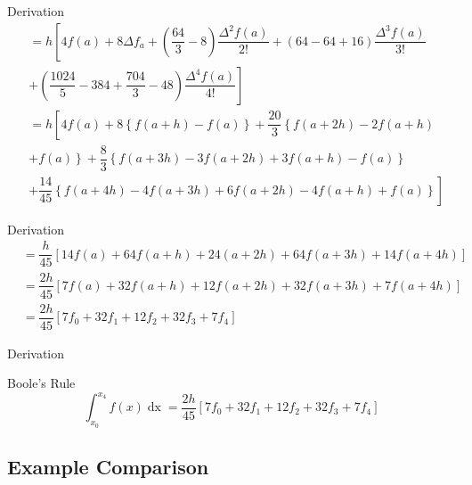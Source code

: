 \documentclass{beamer}
\begin{document}
\begin{frame}{Derivation}
  \begin{equation*}
    \begin{aligned}
      &= h\left[4f(a) + 8\Delta f_a + \left(\dfrac{64}{3} - 8\right)\dfrac{\Delta^2 f(a)}{2!} + \left(64 - 64 + 16\right)\dfrac{\Delta^3 f(a)}{3!} \right. \\ 
      &+ \left. \left(\dfrac{1024}{5} - 384 + \dfrac{704}{3} - 48\right)\dfrac{\Delta^4 f(a)}{4!}\right] \\
      &= h\left[4f(a) + 8\left\{f(a + h) - f(a)\right\} + \dfrac{20}{3}\left\{f(a + 2h) - 2f(a + h) \right. \right. \\ 
      &+ \left. f(a)\right\} + \dfrac{8}{3} \left\{f(a + 3h) - 3f(a + 2h) + 3f(a + h) - f(a)\right\} \\
      &+ \left. \dfrac{14}{45}\left\{f(a + 4h) - 4f(a + 3h) + 6f(a + 2h) - 4f(a + h) + f(a)\right\} \right] 
    \end{aligned}
  \end{equation*}
\end{frame}

\begin{frame}{Derivation}
  \begin{equation*}
    \begin{aligned}
      &= \dfrac{h}{45}\left[14f(a) + 64f(a + h) + 24(a + 2h) + 64f(a + 3h) + 14f(a + 4h)\right] \\
      &= \dfrac{2h}{45}\left[7f(a) + 32f(a + h) + 12f(a + 2h) + 32f(a + 3h) + 7f(a + 4h)\right] \\ 
      &= \dfrac{2h}{45}\left[7f_0 + 32f_1 + 12f_2 + 32f_3 + 7f_4\right]
    \end{aligned}
  \end{equation*}
\end{frame}

\begin{frame}{Derivation}
  \begin{definition}{Boole's Rule}   
    \begin{equation}\label{booles}
        \int_{x_0}^{x_4} f(x) \mathop{dx} = \dfrac{2h}{45}\left[7f_0 + 32f_1 + 12f_2 + 32f_3 + 7f_4\right]
    \end{equation}
  \end{definition}
\end{frame}

\subsection{Example Comparison \cite{calculator}}
\end{document}
